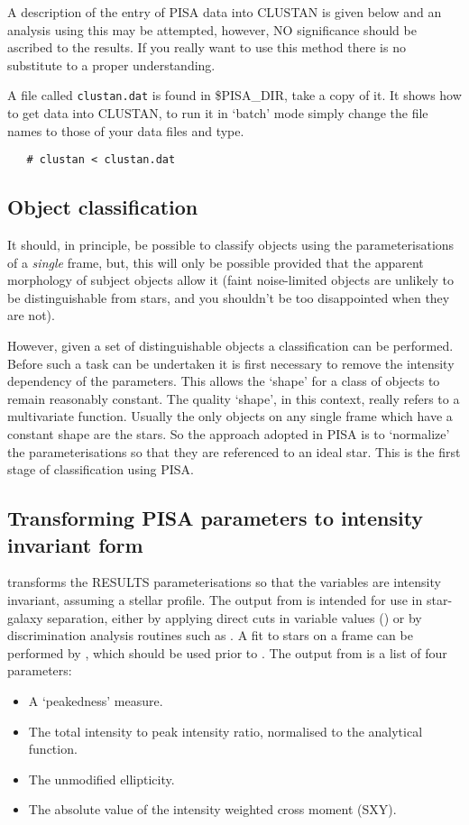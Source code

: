 A description of the entry of PISA data into CLUSTAN is given below and an
analysis using this may be attempted, however, NO significance  should be
ascribed to the results. If you really want to use this method there is no
substitute to a proper understanding.

A file called \verb+clustan.dat+ is found in \$PISA\_DIR, take a copy
of it. It shows how to get data into CLUSTAN, to run it in `batch'
mode simply change the file names to those of your 
data files and type.
\begin{verbatim}
   # clustan < clustan.dat
\end{verbatim}

\subsection{Object classification}

It should, in principle, be possible to classify objects using the
 parameterisations of a {\em single} frame, but, this will only
be possible provided that the apparent morphology of subject objects
allow it (faint noise-limited objects are unlikely to be distinguishable
from stars, and you shouldn't be too disappointed when they are not).

However, given a set of distinguishable objects a classification can be
performed. Before such a task can be undertaken it is first necessary to
remove the intensity dependency of the parameters. This allows the
`shape' for a class of objects to remain reasonably constant. The
quality `shape', in this context, really refers to a multivariate
function. Usually the only objects on any single frame which have a
constant shape are the stars. So the approach adopted in PISA is to
`normalize' the  parameterisations so that they are referenced
to an ideal star. This is the first stage of classification using PISA.

\subsection{Transforming PISA parameters to intensity invariant form}

 transforms the  RESULTS
parameterisations so that the variables are intensity invariant,
assuming a stellar profile. The output from  is
intended for use in star-galaxy separation, either by applying direct
cuts in variable values () or by discrimination analysis
routines such as . A fit to stars on a frame can be
performed by , which should be used prior to
. The output from  is a list of four
parameters:
\begin{itemize}
\item A `peakedness' measure.
\item The total intensity to peak intensity ratio, normalised to the
analytical function.
\item The unmodified ellipticity.
\item The absolute value of the intensity weighted cross moment (SXY).
\end{itemize}

